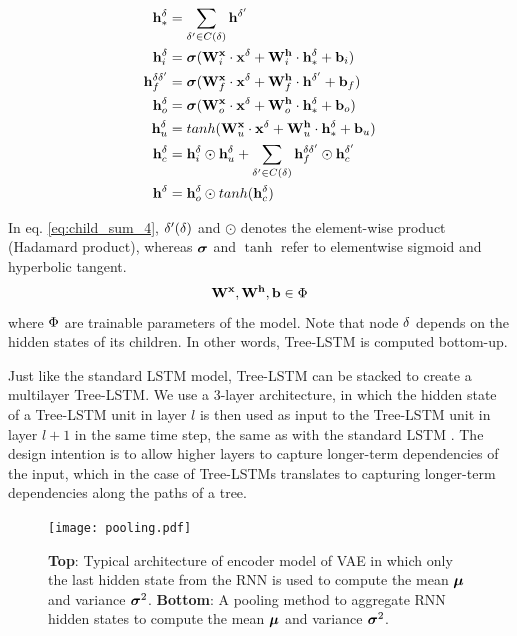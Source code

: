 \begin{align}\label{eq:tree_lstm_encoder}
    \mathbf{h}^\delta_{*} &= \sum_{\delta' \in C(\delta)} \mathbf{h}^{\delta'} \\
    \mathbf{h}_i^\delta &= \boldsymbol\sigma(\mathbf{W}^{\mathbf{x}}_{i} \cdot \mathbf{x}^\delta + \mathbf{W}^{\mathbf{h}}_{i} \cdot \mathbf{h}^\delta_* + \mathbf{b}_{i})  \\ 
    \mathbf{h}_f^{\delta \delta'} &= \boldsymbol\sigma(\mathbf{W}^{\mathbf{x}}_{f} \cdot \mathbf{x}^\delta + \mathbf{W}^{\mathbf{h}}_{f} \cdot \mathbf{h}^{\delta'} + \mathbf{b}_{f}) \\\label{eq:child_sum_4}
    \mathbf{h}_o^\delta &= \boldsymbol\sigma(\mathbf{W}^{\mathbf{x}}_{o} \cdot \mathbf{x}^\delta + \mathbf{W}^{\mathbf{h}}_{o} \cdot \mathbf{h}^\delta_* + \mathbf{b}_{o}) \\
    \mathbf{h}_u^\delta &= tanh(\mathbf{W}^{\mathbf{x}}_{u} \cdot \mathbf{x}^\delta + \mathbf{W}^{\mathbf{h}}_{u} \cdot \mathbf{h}^\delta_* + \mathbf{b}_{u}) \\
    \mathbf{h}_c^\delta &= \mathbf{h}_i^\delta \odot \mathbf{h}_u^\delta + \sum_{\delta' \in C(\delta)} \mathbf{h}_f^{\delta \delta'} \odot \mathbf{h}_c^{\delta'} \\
    \mathbf{h}^\delta &= \mathbf{h}_o^\delta \odot tanh(\mathbf{h}_c^\delta)
\end{align}

In eq. \ref{eq:child_sum_4}, $\delta'(\delta)$ and $\odot$ denotes the element-wise product (Hadamard product), whereas $\boldsymbol\sigma$ and $\tanh$ refer to elementwise sigmoid and hyperbolic tangent. 
\begin{equation}
    \mathbf{W}^{\mathbf{x}}, \mathbf{W}^{\mathbf{h}}, \mathbf{b} \in \Phi
\end{equation}
where $\Phi$ are trainable parameters of the model. 
Note that node $\delta$ depends on the hidden states of its children. 
In other words, Tree-LSTM is computed bottom-up. 

Just like the standard LSTM model, Tree-LSTM can be stacked to create a multilayer Tree-LSTM. 
We use a 3-layer architecture, in which the hidden state of a Tree-LSTM unit in layer $l$ is then used as input to the Tree-LSTM unit in layer $l + 1$ in the same time step, the same as with the standard LSTM \cite{graves2013hybrid}. 
The design intention is to allow higher layers to capture longer-term dependencies of the input, which in the case of Tree-LSTMs translates to capturing longer-term dependencies along the paths of a tree.

\begin{figure}
    \centering
    \texttt{[image: pooling.pdf]}
    \caption[RNN pooling]{\textbf{Top}: Typical architecture of encoder model of VAE in which only the last hidden state from the RNN is used to compute the mean $\boldsymbol\mu$ and variance $\boldsymbol\sigma^2$. \textbf{Bottom}: A pooling method to aggregate RNN hidden states to compute the mean $\boldsymbol\mu$ and variance $\boldsymbol\sigma^2$.}
    \label{fig:pooling}
\end{figure}




